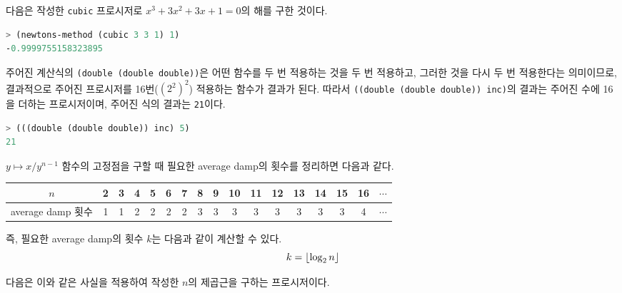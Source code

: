 다음은 작성한 \texttt{cubic} 프로시저로 $x^3+3x^2 + 3x + 1 = 0$의 해를 구한
것이다.

\begin{lstlisting}[language=Scheme]
> (newtons-method (cubic 3 3 1) 1)
-0.9999755158323895
\end{lstlisting}


주어진 계산식의 \texttt{(double (double double))}은 어떤 함수를 두 번
적용하는 것을 두 번 적용하고, 그러한 것을 다시 두 번 적용한다는 의미이므로,
결과적으로 주어진 프로시저를 16번($(2^2)^2$) 적용하는 함수가 결과가 된다. 따라서
\texttt{((double (double double)) inc)}의 결과는 주어진 수에 16을 더하는
프로시저이며, 주어진 식의 결과는 \texttt{21}이다.
\begin{lstlisting}[language=Scheme]
> (((double (double double)) inc) 5)
21
\end{lstlisting}




$y \mapsto x/y^{n-1}$ 함수의 고정점을 구할 때 필요한 average damp의 횟수를
정리하면 다음과 같다.

\begin{center}
\begin{tabular}{c|c|c|c|c|c|c|c|c|c|c|c|c|c|c|c|c}
  $n$
  & 2 & 3 & 4 & 5 & 6 & 7 & 8 & 9 & 10 & 11 & 12 & 13 & 14 & 15 & 16 & $\cdots$
  \\ \hline
  average damp 횟수
  & 1 & 1 & 2 & 2 & 2 & 2 & 3 & 3 & 3  & 3  & 3  & 3  & 3  & 3  & 4  & $\cdots$
\end{tabular}
\end{center}

즉, 필요한 average damp의 횟수 $k$는 다음과 같이 계산할 수 있다.
\begin{equation}\notag
  k = \lfloor \log_2 n \rfloor
\end{equation}

다음은 이와 같은 사실을 적용하여 작성한 $n$의 제곱근을 구하는
프로시저이다.




